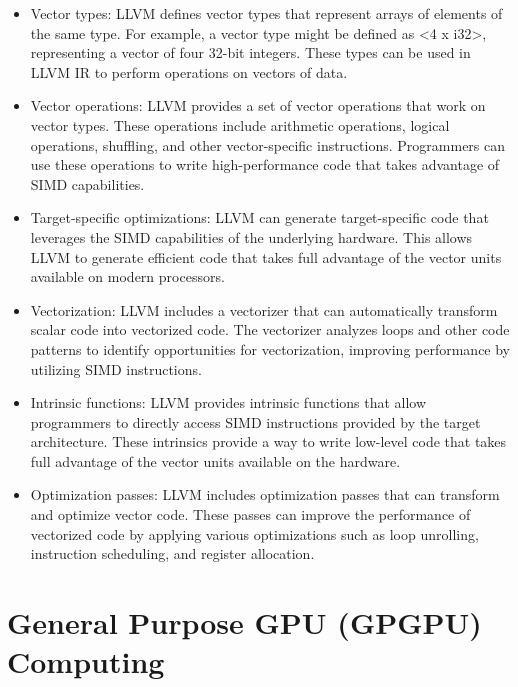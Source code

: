 \begin{itemize}

\item Vector types: LLVM defines vector types that represent arrays of
  elements of the same type. For example, a vector type might be
  defined as <4 x i32>, representing a vector of four 32-bit integers.
  These types can be used in LLVM IR to perform operations on vectors
  of data.

\item Vector operations: LLVM provides a set of vector operations that
  work on vector types. These operations include arithmetic operations,
  logical operations, shuffling, and other vector-specific
  instructions. Programmers can use these operations to write
  high-performance code that takes advantage of SIMD capabilities.

\item Target-specific optimizations: LLVM can generate target-specific
  code that leverages the SIMD capabilities of the underlying
  hardware. This allows LLVM to generate efficient code that takes
  full advantage of the vector units available on modern processors.

\item Vectorization: LLVM includes a vectorizer that can automatically
  transform scalar code into vectorized code. The vectorizer analyzes
  loops and other code patterns to identify opportunities for
  vectorization, improving performance by utilizing SIMD
  instructions.

\item Intrinsic functions: LLVM provides intrinsic functions that allow
  programmers to directly access SIMD instructions provided by the
  target architecture. These intrinsics provide a way to write
  low-level code that takes full advantage of the vector units
  available on the hardware.

\item Optimization passes: LLVM includes optimization passes that can
    transform and optimize vector code. These passes can improve the
    performance of vectorized code by applying various optimizations
    such as loop unrolling, instruction scheduling, and register
    allocation.

\end{itemize}

\section {General Purpose GPU (GPGPU) Computing}

